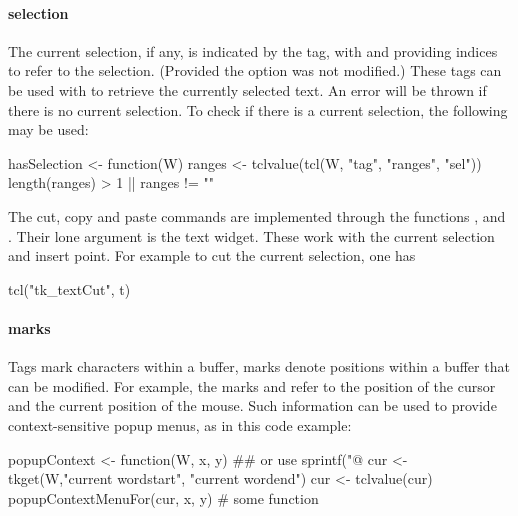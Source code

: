 \paragraph{selection}
The current selection, if any, is indicated by the  tag,
with  and  providing indices to refer
to the selection. (Provided the option  was not
modified.) These tags can be used with  to retrieve the
currently selected text. An error will be thrown if there is no
current selection. To check if there is a current selection, the following may be used:
\begin{Schunk}
\begin{Sinput}
 hasSelection <- function(W) {
   ranges <- tclvalue(tcl(W, "tag", "ranges", "sel"))
   length(ranges) > 1 || ranges != ""
 }
\end{Sinput}
\end{Schunk}

The cut, copy and paste commands are implemented through the \Tk\/ functions
,  and
. Their lone argument is the text widget. These
work with the current selection and insert point. For example to cut
the current selection, one has
\begin{Schunk}
\begin{Sinput}
 tcl("tk_textCut", t)
\end{Sinput}
\end{Schunk}

\paragraph{marks}
Tags mark characters within a buffer, marks denote positions within a
buffer that can be modified. For example, the marks  and
 refer to the position of the cursor and the current
position of the mouse. Such information can be used to provide
context-sensitive popup menus, as in this code example:
\begin{Schunk}
\begin{Sinput}
 popupContext <- function(W, x, y) {
   ## or use sprintf("@%
   cur <- tkget(W,"current  wordstart", "current wordend") 
   cur <- tclvalue(cur)
   popupContextMenuFor(cur, x, y)        # some function
 }
\end{Sinput}
\end{Schunk}

